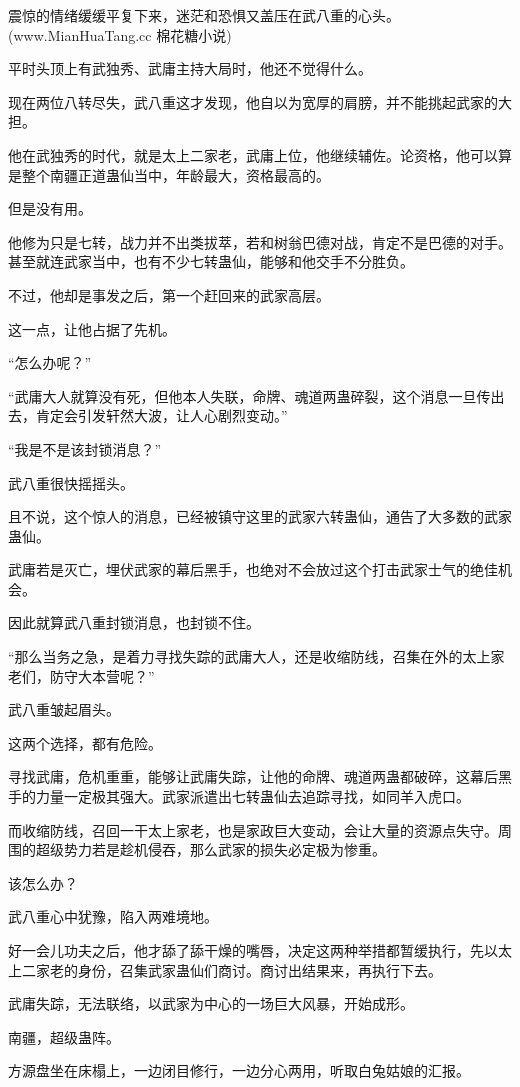 \begin{this_body}
震惊的情绪缓缓平复下来，迷茫和恐惧又盖压在武八重的心头。(www.MianHuaTang.cc 棉花糖小说)

平时头顶上有武独秀、武庸主持大局时，他还不觉得什么。

现在两位八转尽失，武八重这才发现，他自以为宽厚的肩膀，并不能挑起武家的大担。

他在武独秀的时代，就是太上二家老，武庸上位，他继续辅佐。论资格，他可以算是整个南疆正道蛊仙当中，年龄最大，资格最高的。

但是没有用。

他修为只是七转，战力并不出类拔萃，若和树翁巴德对战，肯定不是巴德的对手。甚至就连武家当中，也有不少七转蛊仙，能够和他交手不分胜负。

不过，他却是事发之后，第一个赶回来的武家高层。

这一点，让他占据了先机。

“怎么办呢？”

“武庸大人就算没有死，但他本人失联，命牌、魂道两蛊碎裂，这个消息一旦传出去，肯定会引发轩然大波，让人心剧烈变动。”

“我是不是该封锁消息？”

武八重很快摇摇头。

且不说，这个惊人的消息，已经被镇守这里的武家六转蛊仙，通告了大多数的武家蛊仙。

武庸若是灭亡，埋伏武家的幕后黑手，也绝对不会放过这个打击武家士气的绝佳机会。

因此就算武八重封锁消息，也封锁不住。

“那么当务之急，是着力寻找失踪的武庸大人，还是收缩防线，召集在外的太上家老们，防守大本营呢？”

武八重皱起眉头。

这两个选择，都有危险。

寻找武庸，危机重重，能够让武庸失踪，让他的命牌、魂道两蛊都破碎，这幕后黑手的力量一定极其强大。武家派遣出七转蛊仙去追踪寻找，如同羊入虎口。

而收缩防线，召回一干太上家老，也是家政巨大变动，会让大量的资源点失守。周围的超级势力若是趁机侵吞，那么武家的损失必定极为惨重。

该怎么办？

武八重心中犹豫，陷入两难境地。

好一会儿功夫之后，他才舔了舔干燥的嘴唇，决定这两种举措都暂缓执行，先以太上二家老的身份，召集武家蛊仙们商讨。商讨出结果来，再执行下去。

武庸失踪，无法联络，以武家为中心的一场巨大风暴，开始成形。

南疆，超级蛊阵。

方源盘坐在床榻上，一边闭目修行，一边分心两用，听取白兔姑娘的汇报。


\end{this_body}
